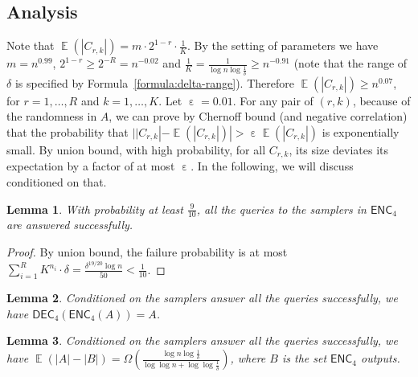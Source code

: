 \documentclass[10pt]{article}
\DeclareMathOperator*{\E}{\mathbb{E}}
\DeclareMathOperator*{\eps}{\varepsilon}
\newtheorem{lemma}{Lemma}
\newcommand{\enc}{\textsf{ENC}\xspace}
\newcommand{\dec}{\textsf{DEC}\xspace}
\begin{document}
\subsection{Analysis} 

Note that $\E(|C_{r,k}|)=m\cdot 2^{1-r}\cdot \frac{1}{K}$. By the setting of parameters we have $m=n^{0.99}$, $2^{1-r}\ge 2^{-R}=n^{-0.02}$ and $\frac{1}{K}=\frac{1}{\log n \log \frac{1}{\delta}}\ge n^{-0.91}$ (note that the range of $\delta$ is specified by Formula~\ref{formula:delta-range}). Therefore $\E(|C_{r,k}|) \ge n^{0.07}$, for $r=1,\ldots, R$ and $k=1,\ldots, K$. Let $\eps=0.01$. For any pair of $(r,k)$, because of the randomness in $A$, we can prove by Chernoff bound (and negative correlation) that the probability that $||C_{r,k}|-\E(|C_{r,k}|)|>\eps \E(|C_{r,k}|)$ is exponentially small. By union bound, with high probability, for all $C_{r,k}$, its size deviates its expectation by a factor of at most $\eps$. In the following, we will discuss conditioned on that.

\begin{lemma} \label{lemma:enc_4-sampler-work}
  With probability at least $\frac{9}{10}$, all the queries to the samplers in $\enc_4$ are answered successfully. 
\end{lemma}

\begin{proof}
  By union bound, the failure probability is at most $\sum_{i=1}^{R} K^{n_i}\cdot \delta = \frac{\delta^{19/20} \log n}{50} < \frac{1}{10}$. 
\end{proof}

\begin{lemma}
  Conditioned on the samplers answer all the queries successfully, we have $\dec_4(\enc_4(A))=A$.
\end{lemma}

\begin{lemma} \label{lemma:words-saving}
  Conditioned on the samplers answer all the queries successfully, we have $\E(|A|-|B|)=\Omega(\frac{\log n \log \frac{1}{\delta}}{\log\log n + \log\log \frac{1}{\delta}})$, where $B$ is the set $\enc_4$ outputs.
\end{lemma}
\end{document}
